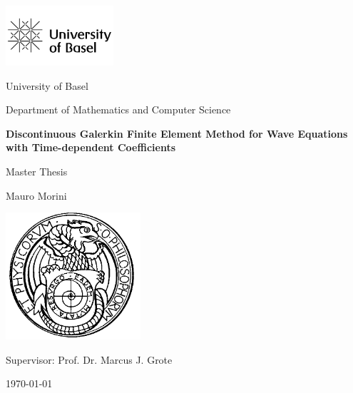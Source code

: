 \begin{titlepage}
    \centering
    \begin{flushleft}
        \includegraphics[width=4cm]{figures/university-of-basel-vector-logo.png} %
    \end{flushleft}

    \vspace*{1cm}

    {\Large University of Basel \par}
    {\Large Department of Mathematics and Computer Science \par}
    \vspace{2.5cm}

    {\Huge\bfseries Discontinuous Galerkin Finite Element Method for Wave Equations with Time-dependent Coefficients \par}
    \vspace{1.5cm}

    {\Large Master Thesis\par}
    \vspace{2cm}

    {\Large Mauro Morini\par}
    \vspace{1cm}

    \includegraphics[width=5cm]{figures/Siegel_Phil_Nat589.png} %
    \vspace{1cm}

    {\large Supervisor: Prof. Dr. Marcus J. Grote\par}
    \vfill

    {\large \today\par}
\end{titlepage}